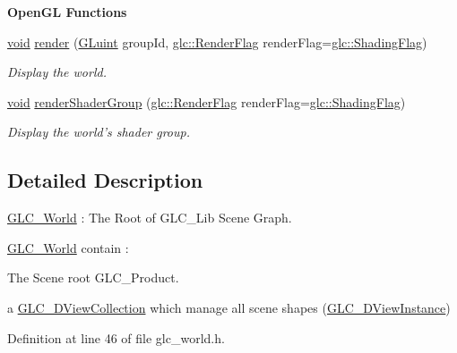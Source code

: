 \begin{Indent}{\bf Open\-G\-L Functions}\par
\begin{DoxyCompactItemize}
\item 
\hyperlink{group___u_a_v_objects_plugin_ga444cf2ff3f0ecbe028adce838d373f5c}{void} \hyperlink{class_g_l_c___world_afa0e0617370f2547a50194120a3098a0}{render} (\hyperlink{glext_8h_a2f0c8cd5c21f9fcbd931c3f48bc90dfc}{G\-Luint} group\-Id, \hyperlink{namespaceglc_a51a421b53283d5996142222b9baca26c}{glc\-::\-Render\-Flag} render\-Flag=\hyperlink{namespaceglc_a51a421b53283d5996142222b9baca26cad7fd33537da15e115a2d093f658d5e5f}{glc\-::\-Shading\-Flag})
\begin{DoxyCompactList}\small\item\em Display the world. \end{DoxyCompactList}\item 
\hyperlink{group___u_a_v_objects_plugin_ga444cf2ff3f0ecbe028adce838d373f5c}{void} \hyperlink{class_g_l_c___world_a85069427702ecdb340e21b160705cc88}{render\-Shader\-Group} (\hyperlink{namespaceglc_a51a421b53283d5996142222b9baca26c}{glc\-::\-Render\-Flag} render\-Flag=\hyperlink{namespaceglc_a51a421b53283d5996142222b9baca26cad7fd33537da15e115a2d093f658d5e5f}{glc\-::\-Shading\-Flag})
\begin{DoxyCompactList}\small\item\em Display the world's shader group. \end{DoxyCompactList}\end{DoxyCompactItemize}
\end{Indent}


\subsection{Detailed Description}
\hyperlink{class_g_l_c___world}{G\-L\-C\-\_\-\-World} \-: The Root of G\-L\-C\-\_\-\-Lib Scene Graph. 

\hyperlink{class_g_l_c___world}{G\-L\-C\-\_\-\-World} contain \-:
\begin{DoxyItemize}
\item The Scene root G\-L\-C\-\_\-\-Product.
\item a \hyperlink{class_g_l_c__3_d_view_collection}{G\-L\-C\-\_\-D\-View\-Collection} which manage all scene shapes (\hyperlink{class_g_l_c__3_d_view_instance}{G\-L\-C\-\_\-D\-View\-Instance}) 
\end{DoxyItemize}

Definition at line 46 of file glc\-\_\-world.\-h.



